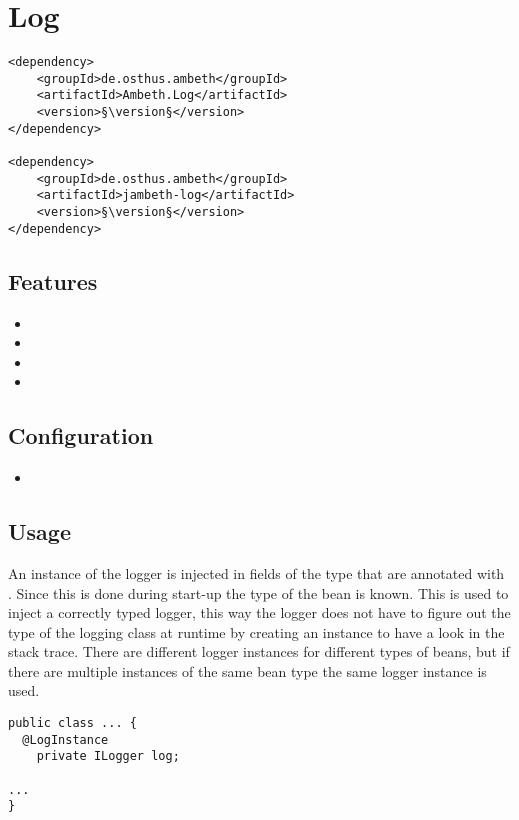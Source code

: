 \section{Log}
\label{module:Log}
\ClearAPI
\TODO
\begin{lstlisting}[style=POM,caption={Maven modules to use \emph{Ambeth Log}}]
<dependency>
	<groupId>de.osthus.ambeth</groupId>
	<artifactId>Ambeth.Log</artifactId>
	<version>§\version§</version>
</dependency>

<dependency>
	<groupId>de.osthus.ambeth</groupId>
	<artifactId>jambeth-log</artifactId>
	<version>§\version§</version>
</dependency>
\end{lstlisting}
\subsection{Features}
\begin{itemize}
	\item {}
	\item {}
	\item {}
	\item {}
\end{itemize}

\subsection{Configuration}
\begin{itemize}
	\item {}
\end{itemize}

\subsection{Usage}
An instance of the \AMBETH logger is injected in fields of the type  that are annotated with . Since this is done during start-up the type of the bean is known. This is used to inject a correctly typed logger, this way the logger does not have to figure out the type of the logging class at runtime by creating an  instance to have a look in the stack trace. There are different logger instances for different types of beans, but if there are multiple instances of the same bean type the same logger instance is used.

\begin{lstlisting}[style=Java,caption={Example of a logger injection field}]
public class ... {
  @LogInstance
	private ILogger log;

...
}
\end{lstlisting}

